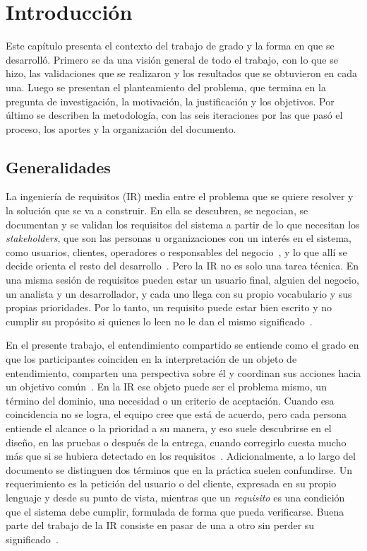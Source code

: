 \documentclass[12pt,letterpaper,oneside]{report}
\begin{document}
\tableofcontents
\listoffigures
\listoftables

\cleardoublepage
{}

\chapter{Introducción}
\label{ch:introduccion}

Este capítulo presenta el contexto del trabajo de grado y la forma en que se
desarrolló. Primero se da una visión general de todo el trabajo, con lo que se
hizo, las validaciones que se realizaron y los resultados que se obtuvieron en
cada una. Luego se presentan el planteamiento del problema, que termina en la
pregunta de investigación, la motivación, la justificación y los objetivos. Por último se
describen la metodología, con las seis iteraciones por las que pasó el proceso,
los aportes y la organización del documento.

\section{Generalidades}
\label{sec:generalidades}
La ingeniería de requisitos (IR) media entre el problema que se quiere resolver
y la solución que se va a construir. En ella se descubren, se negocian, se
documentan y se validan los requisitos del sistema a partir de lo que necesitan
los \textit{stakeholders}, que son las personas u organizaciones con un interés
en el sistema, como usuarios, clientes, operadores o responsables del
negocio~\cite{iso29148}, y lo que allí se decide orienta el resto del
desarrollo~\cite{nuseibeh2000roadmap}. Pero la IR no es solo una tarea técnica.
En una misma sesión de requisitos pueden estar un usuario final, alguien del
negocio, un analista y un desarrollador, y cada uno llega con su propio
vocabulario y sus propias prioridades. Por lo tanto, un requisito puede estar
bien escrito y no cumplir su propósito si quienes lo leen no le dan el mismo
significado~\cite{fuller2021blurring}.

En el presente trabajo, el entendimiento compartido se entiende como el grado en
que los participantes coinciden en la interpretación de un objeto de
entendimiento, comparten una perspectiva sobre él y coordinan sus acciones hacia
un objetivo común~\cite{bittner2014shared}. En la IR ese objeto puede ser el
problema mismo, un término del dominio, una necesidad o un criterio de aceptación. Cuando esa coincidencia no se logra, el equipo cree que
está de acuerdo, pero cada persona entiende el alcance o la prioridad a su
manera, y eso suele descubrirse en el diseño, en las pruebas o después de la
entrega, cuando corregirlo cuesta mucho más que si se hubiera detectado en los
requisitos~\cite{boehm2001defect}. Adicionalmente, a lo largo del documento se
distinguen dos términos que en la práctica suelen confundirse. Un requerimiento es la petición del usuario o del cliente, expresada en su
propio lenguaje y desde su punto de vista, mientras que un \emph{requisito} es una
condición que el sistema debe cumplir, formulada de forma que pueda
verificarse. Buena parte del trabajo de la IR consiste en pasar
de una a otro sin perder su significado~\cite{iso29148}.
\end{document}
